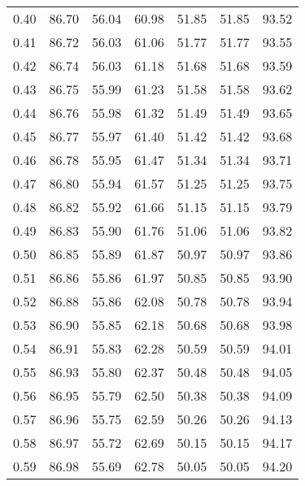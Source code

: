 \begin{tabular}{|c|c|c|c|c|c|c|}
      0.40 &     86.70 &     56.04 &      60.98 &   51.85 &      51.85 &         93.52 \\
      0.41 &     86.72 &     56.03 &      61.06 &   51.77 &      51.77 &         93.55 \\
      0.42 &     86.74 &     56.03 &      61.18 &   51.68 &      51.68 &         93.59 \\
      0.43 &     86.75 &     55.99 &      61.23 &   51.58 &      51.58 &         93.62 \\
      0.44 &     86.76 &     55.98 &      61.32 &   51.49 &      51.49 &         93.65 \\
      0.45 &     86.77 &     55.97 &      61.40 &   51.42 &      51.42 &         93.68 \\
      0.46 &     86.78 &     55.95 &      61.47 &   51.34 &      51.34 &         93.71 \\
      0.47 &     86.80 &     55.94 &      61.57 &   51.25 &      51.25 &         93.75 \\
      0.48 &     86.82 &     55.92 &      61.66 &   51.15 &      51.15 &         93.79 \\
      0.49 &     86.83 &     55.90 &      61.76 &   51.06 &      51.06 &         93.82 \\
      0.50 &     86.85 &     55.89 &      61.87 &   50.97 &      50.97 &         93.86 \\
      0.51 &     86.86 &     55.86 &      61.97 &   50.85 &      50.85 &         93.90 \\
      0.52 &     86.88 &     55.86 &      62.08 &   50.78 &      50.78 &         93.94 \\
      0.53 &     86.90 &     55.85 &      62.18 &   50.68 &      50.68 &         93.98 \\
      0.54 &     86.91 &     55.83 &      62.28 &   50.59 &      50.59 &         94.01 \\
      0.55 &     86.93 &     55.80 &      62.37 &   50.48 &      50.48 &         94.05 \\
      0.56 &     86.95 &     55.79 &      62.50 &   50.38 &      50.38 &         94.09 \\
      0.57 &     86.96 &     55.75 &      62.59 &   50.26 &      50.26 &         94.13 \\
      0.58 &     86.97 &     55.72 &      62.69 &   50.15 &      50.15 &         94.17 \\
      0.59 &     86.98 &     55.69 &      62.78 &   50.05 &      50.05 &         94.20 \\

\end{tabular}
